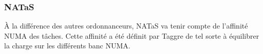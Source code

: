 \subsubsection{NATaS}
\`A la différence des autres ordonnanceurs, NATaS va tenir compte de l'affinité NUMA des tâches.
%
Cette affinité a été définit par Taggre de tel sorte à équilibrer la charge sur les différents banc NUMA.
%
